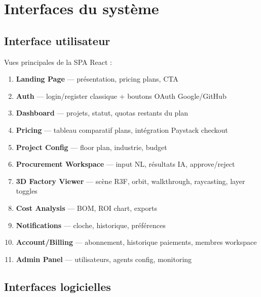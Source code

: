 \documentclass[12pt,a4paper]{article}
\begin{document}
\section{Interfaces du système}

\subsection{Interface utilisateur}

Vues principales de la SPA React :

\begin{enumerate}
  \item \textbf{Landing Page} — présentation, pricing plans, CTA
  \item \textbf{Auth} — login/register classique + boutons OAuth Google/GitHub
  \item \textbf{Dashboard} — projets, statut, quotas restants du plan
  \item \textbf{Pricing} — tableau comparatif plans, intégration Paystack checkout
  \item \textbf{Project Config} — floor plan, industrie, budget
  \item \textbf{Procurement Workspace} — input NL, résultats IA, approve/reject
  \item \textbf{3D Factory Viewer} — scène R3F, orbit, walkthrough, raycasting, layer toggles
  \item \textbf{Cost Analysis} — BOM, ROI chart, exports
  \item \textbf{Notifications} — cloche, historique, préférences
  \item \textbf{Account/Billing} — abonnement, historique paiements, membres workspace
  \item \textbf{Admin Panel} — utilisateurs, agents config, monitoring
\end{enumerate}

\subsection{Interfaces logicielles}
\end{document}
